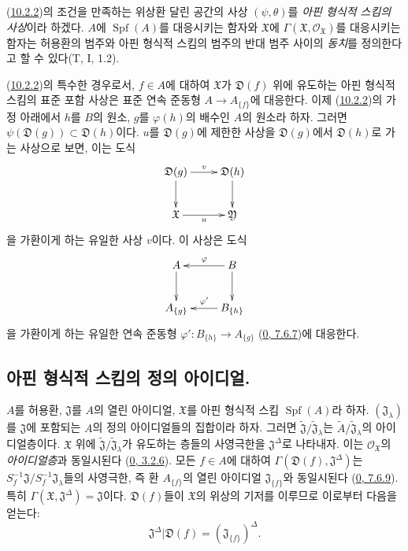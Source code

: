 (\hyperref[I.10.2.2-ko]{10.2.2})의 조건을 만족하는 위상환 달린 공간의
사상 $(\psi,\theta)$를 \emph{아핀 형식적 스킴의 사상}이라 하겠다.
$A$에 $\operatorname{Spf}(A)$를 대응시키는 함자와 $\mathfrak{X}$에
$\Gamma(\mathfrak{X},\mathscr{O}_{\mathfrak{X}})$를 대응시키는 함자는
허용환의 범주와 아핀 형식적 스킴의 범주의 반대 범주 사이의
\emph{동치}를 정의한다고 할 수 있다(T, I, 1.2).

\begin{env}[10.2.3]
\label{I.10.2.3-ko}
(\hyperref[I.10.2.2-ko]{10.2.2})의 특수한 경우로서, $f\in A$에 대하여
$\mathfrak{X}$가 $\mathfrak{D}(f)$ 위에 유도하는 아핀 형식적 스킴의
표준 포함 사상은 표준 연속 준동형 $A\to A_{\{f\}}$에 대응한다. 이제
(\hyperref[I.10.2.2-ko]{10.2.2})의 가정 아래에서 $h$를 $B$의 원소,
$g$를 $\varphi(h)$의 배수인 $A$의 원소라 하자. 그러면
$\psi(\mathfrak{D}(g))\subset\mathfrak{D}(h)$이다. $u$를
$\mathfrak{D}(g)$에 제한한 사상을 $\mathfrak{D}(g)$에서
$\mathfrak{D}(h)$로 가는 사상으로 보면, 이는 도식
\[
  \xymatrix{
    \mathfrak{D}(g)\ar[r]^v\ar[d] &
    \mathfrak{D}(h)\ar[d]\\
    \mathfrak{X}\ar[r]_u &
    \mathfrak{Y}
  }
\]
을 가환이게 하는 유일한 사상 $v$이다. 이 사상은 도식
\[
  \xymatrix{
    A\ar[d] &
    B\ar[l]_\varphi\ar[d]\\
    A_{\{g\}} &
    B_{\{h\}}\ar[l]_{\varphi'}
  }
\]
을 가환이게 하는 유일한 연속 준동형
$\varphi':B_{\{h\}}\to A_{\{g\}}$
(\hyperref[0.7.6.7-ko]{0, 7.6.7})에 대응한다.
\end{env}

\subsection{아핀 형식적 스킴의 정의 아이디얼.}
\label{subsection:I.10.3-ko}

\begin{env}[10.3.1]
\label{I.10.3.1-ko}
$A$를 허용환, $\mathfrak{J}$를 $A$의 열린 아이디얼,
$\mathfrak{X}$를 아핀 형식적 스킴 $\operatorname{Spf}(A)$라 하자.
$(\mathfrak{J}_\lambda)$를 $\mathfrak{J}$에 포함되는 $A$의 정의
아이디얼들의 집합이라 하자. 그러면
$\widetilde{\mathfrak{J}}/\widetilde{\mathfrak{J}}_\lambda$는
$\widetilde{A}/\widetilde{\mathfrak{J}}_\lambda$의 아이디얼층이다.
$\mathfrak{X}$ 위에
$\widetilde{\mathfrak{J}}/\widetilde{\mathfrak{J}}_\lambda$가 유도하는
층들의 사영극한을 $\mathfrak{J}^\Delta$로 나타내자. 이는
$\mathscr{O}_{\mathfrak{X}}$의 \emph{아이디얼층}과 동일시된다
(\hyperref[0.3.2.6-ko]{0, 3.2.6}). 모든 $f\in A$에 대하여
$\Gamma(\mathfrak{D}(f),\mathfrak{J}^\Delta)$는
$S_f^{-1}\mathfrak{J}/S_f^{-1}\mathfrak{J}_\lambda$들의 사영극한, 즉
환 $A_{\{f\}}$의 열린 아이디얼 $\mathfrak{J}_{\{f\}}$와 동일시된다
(\hyperref[0.7.6.9-ko]{0, 7.6.9}). 특히
$\Gamma(\mathfrak{X},\mathfrak{J}^\Delta)=\mathfrak{J}$이다.
$\mathfrak{D}(f)$들이 $\mathfrak{X}$의 위상의 기저를 이루므로 이로부터
다음을 얻는다:
\[
  \mathfrak{J}^\Delta|\mathfrak{D}(f)
  =(\mathfrak{J}_{\{f\}})^\Delta.
  \tag{10.3.1.1}\label{I.10.3.1.1-ko}
\]
\end{env}

